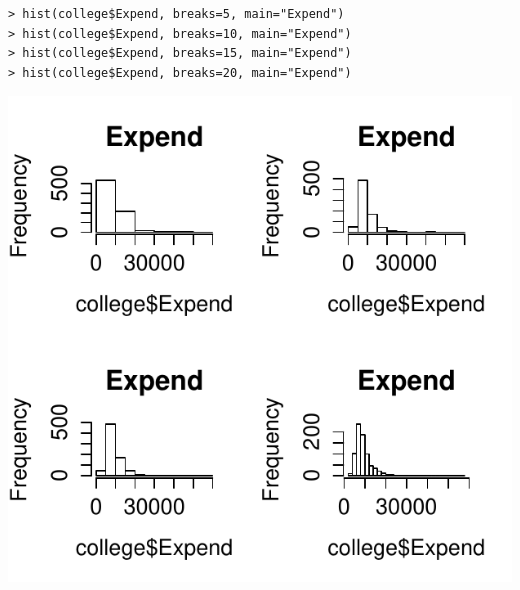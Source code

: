 \documentclass[11pt]{article}
\begin{document}
\begin{enumerate}
\begin{enumerate}
\begin{enumerate}
\begin{lstlisting}
> hist(college$Expend, breaks=5, main="Expend")
> hist(college$Expend, breaks=10, main="Expend")
> hist(college$Expend, breaks=15, main="Expend")
> hist(college$Expend, breaks=20, main="Expend")
\end{lstlisting}
\begin{center}
\includegraphics[scale=.9]{plot4.pdf}
\end{center}


\end{enumerate}
\end{enumerate}
\end{enumerate}
\end{document}
